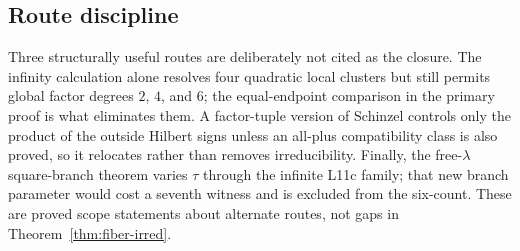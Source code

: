 \subsection{Route discipline}

Three structurally useful routes are deliberately not cited as the
closure.  The infinity calculation alone resolves four quadratic local
clusters but still permits global factor degrees $2$, $4$, and $6$; the
equal-endpoint comparison in the primary proof is what eliminates them.
A factor-tuple version of Schinzel controls only the product of the outside
Hilbert signs unless an all-plus compatibility class is also proved, so it
relocates rather than removes irreducibility.  Finally, the free-$\lambda$
square-branch theorem varies $\tau$ through the infinite L11c family; that
new branch parameter would cost a seventh witness and is excluded from the
six-count.  These are proved scope statements about alternate routes, not
gaps in Theorem~\ref{thm:fiber-irred}.
